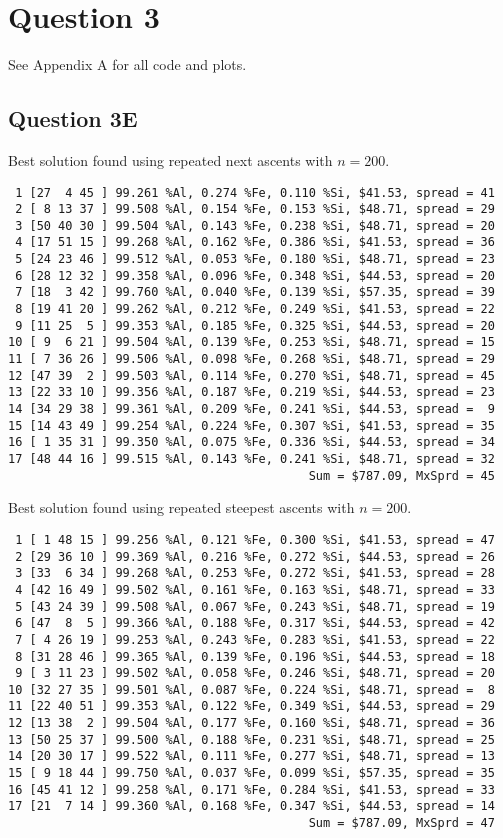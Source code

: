 \documentclass{article}
\begin{document}
\section{Question 3}
See Appendix A for all code and plots. 

\subsection{Question 3E}
Best solution found using repeated 
next ascents with $n=200$.
\begin{verbatim}
 1 [27  4 45 ] 99.261 %Al, 0.274 %Fe, 0.110 %Si, $41.53, spread = 41
 2 [ 8 13 37 ] 99.508 %Al, 0.154 %Fe, 0.153 %Si, $48.71, spread = 29
 3 [50 40 30 ] 99.504 %Al, 0.143 %Fe, 0.238 %Si, $48.71, spread = 20
 4 [17 51 15 ] 99.268 %Al, 0.162 %Fe, 0.386 %Si, $41.53, spread = 36
 5 [24 23 46 ] 99.512 %Al, 0.053 %Fe, 0.180 %Si, $48.71, spread = 23
 6 [28 12 32 ] 99.358 %Al, 0.096 %Fe, 0.348 %Si, $44.53, spread = 20
 7 [18  3 42 ] 99.760 %Al, 0.040 %Fe, 0.139 %Si, $57.35, spread = 39
 8 [19 41 20 ] 99.262 %Al, 0.212 %Fe, 0.249 %Si, $41.53, spread = 22
 9 [11 25  5 ] 99.353 %Al, 0.185 %Fe, 0.325 %Si, $44.53, spread = 20
10 [ 9  6 21 ] 99.504 %Al, 0.139 %Fe, 0.253 %Si, $48.71, spread = 15
11 [ 7 36 26 ] 99.506 %Al, 0.098 %Fe, 0.268 %Si, $48.71, spread = 29
12 [47 39  2 ] 99.503 %Al, 0.114 %Fe, 0.270 %Si, $48.71, spread = 45
13 [22 33 10 ] 99.356 %Al, 0.187 %Fe, 0.219 %Si, $44.53, spread = 23
14 [34 29 38 ] 99.361 %Al, 0.209 %Fe, 0.241 %Si, $44.53, spread =  9
15 [14 43 49 ] 99.254 %Al, 0.224 %Fe, 0.307 %Si, $41.53, spread = 35
16 [ 1 35 31 ] 99.350 %Al, 0.075 %Fe, 0.336 %Si, $44.53, spread = 34
17 [48 44 16 ] 99.515 %Al, 0.143 %Fe, 0.241 %Si, $48.71, spread = 32
                                          Sum = $787.09, MxSprd = 45
\end{verbatim}
Best solution found using repeated steepest ascents with $n=200$.
\begin{verbatim}
 1 [ 1 48 15 ] 99.256 %Al, 0.121 %Fe, 0.300 %Si, $41.53, spread = 47
 2 [29 36 10 ] 99.369 %Al, 0.216 %Fe, 0.272 %Si, $44.53, spread = 26
 3 [33  6 34 ] 99.268 %Al, 0.253 %Fe, 0.272 %Si, $41.53, spread = 28
 4 [42 16 49 ] 99.502 %Al, 0.161 %Fe, 0.163 %Si, $48.71, spread = 33
 5 [43 24 39 ] 99.508 %Al, 0.067 %Fe, 0.243 %Si, $48.71, spread = 19
 6 [47  8  5 ] 99.366 %Al, 0.188 %Fe, 0.317 %Si, $44.53, spread = 42
 7 [ 4 26 19 ] 99.253 %Al, 0.243 %Fe, 0.283 %Si, $41.53, spread = 22
 8 [31 28 46 ] 99.365 %Al, 0.139 %Fe, 0.196 %Si, $44.53, spread = 18
 9 [ 3 11 23 ] 99.502 %Al, 0.058 %Fe, 0.246 %Si, $48.71, spread = 20
10 [32 27 35 ] 99.501 %Al, 0.087 %Fe, 0.224 %Si, $48.71, spread =  8
11 [22 40 51 ] 99.353 %Al, 0.122 %Fe, 0.349 %Si, $44.53, spread = 29
12 [13 38  2 ] 99.504 %Al, 0.177 %Fe, 0.160 %Si, $48.71, spread = 36
13 [50 25 37 ] 99.500 %Al, 0.188 %Fe, 0.231 %Si, $48.71, spread = 25
14 [20 30 17 ] 99.522 %Al, 0.111 %Fe, 0.277 %Si, $48.71, spread = 13
15 [ 9 18 44 ] 99.750 %Al, 0.037 %Fe, 0.099 %Si, $57.35, spread = 35
16 [45 41 12 ] 99.258 %Al, 0.171 %Fe, 0.284 %Si, $41.53, spread = 33
17 [21  7 14 ] 99.360 %Al, 0.168 %Fe, 0.347 %Si, $44.53, spread = 14
                                          Sum = $787.09, MxSprd = 47
\end{verbatim}
\end{document}
